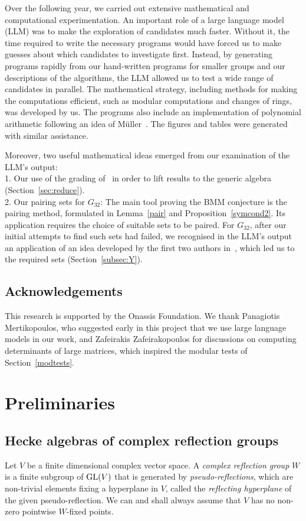 \documentclass[11pt, reqno]{amsart}
\numberwithin{equation}{section}
\theoremstyle{remark}
\begin{document}
Over the following year, we carried out extensive mathematical and computational experimentation. An important role of a large language model (LLM) was to make the exploration of candidates much faster. Without it, the time required to write the necessary programs would have forced us to make guesses about which candidates to investigate first. Instead, by generating programs rapidly from our hand-written programs for smaller groups and our descriptions of the algorithms, the LLM allowed us to test a wide range of candidates in parallel. The mathematical strategy, including methods for making the computations efficient, such as modular computations and changes of rings, was developed by us. The programs also include an implementation of polynomial arithmetic following an idea of M\"uller~\cite{Mul}. The figures and tables were generated with similar assistance.

Moreover, two useful mathematical ideas emerged from our examination of the LLM's output:\\
1. Our use of the grading of~\cite{BMM} in order to lift results to the generic algebra (Section~\ref{sec:reduce}). \\
2. Our pairing sets for $G_{32}$: The main tool proving the BMM conjecture is the pairing method, formulated in Lemma~\ref{pair} and Proposition~\ref{symcond2}. Its application requires the choice of suitable sets to be paired. For $G_{32}$, after our initial attempts to find such sets had failed, we recognised in the LLM's output an application of an idea developed by the first two authors in~\cite{BCCK}, which led us to the required sets (Section~\ref{subsec:Y}). 


\subsection*{Acknowledgements} This research is supported by the Onassis Foundation. We thank Panagiotis Mertikopoulos, who suggested early in this project that we use large language models in our work, and Zafeirakis Zafeirakopoulos for discussions on computing determinants of large matrices, which inspired the modular tests of Section~\ref{modtests}.

	


	\section{Preliminaries}\label{prel}
	
	\subsection{Hecke algebras of complex reflection groups}\label{sec-2.1}
	Let $V$ be a finite dimensional complex vector space.
	A {\em complex reflection group} $W$ is a finite subgroup of ${\rm GL}(V)$ that is generated by {\em pseudo-reflections}, which are non-trivial elements fixing a hyperplane in $V$, called the {\em reflecting hyperplane} of the given pseudo-reflection.
	We can and shall always assume that $V$ has no non-zero pointwise $W$-fixed points.
	
\end{document}
